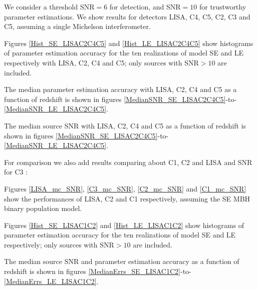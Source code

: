 \documentclass{iopart}
\begin{document}
We consider a threshold SNR$=6$ for detection, and SNR$=10$ for trustworthy parameter estimations. We show results for detectors LISA, C4, C5, C2, C3 and C5,  assuming a single Michelson interferometer. 


Figures \ref{Hist_SE_LISAC2C4C5} and \ref{Hist_LE_LISAC2C4C5} show histograms of parameter estimation accuracy for the ten realizations of model SE and LE respectively with LISA, C2, C4 and C5; only sources with SNR$>10$ are included. 

The median parameter estimation accuracy with LISA, C2, C4 and C5 as a function of redshift is shown in figures \ref{MedianSNR_SE_LISAC2C4C5}-to-\ref{MedianSNR_LE_LISAC2C4C5}.

The median source SNR with LISA, C2, C4 and C5 as a function of redshift is shown in figures \ref{MedianSNR_SE_LISAC2C4C5}-to-\ref{MedianSNR_LE_LISAC2C4C5}.


\vspace{1cm}

For comparison we also add results comparing about C1, C2 and LISA and SNR for C3 : 

Figures \ref{LISA_mc_SNR}, \ref{C3_mc_SNR}, \ref{C2_mc_SNR} and \ref{C1_mc_SNR} show the performances of LISA, C2 and C1 respectively, assuming the SE MBH binary population model.



Figures \ref{Hist_SE_LISAC1C2} and \ref{Hist_LE_LISAC1C2} show histograms of parameter estimation accuracy for the ten realizations of model SE and LE respectively; only sources with SNR$>10$ are included. 
 

The median source SNR and parameter estimation accuracy as a function of redshift is shown in figures \ref{MedianErrs_SE_LISAC1C2}-to-\ref{MedianErrs_LE_LISAC1C2}.


\end{document}
